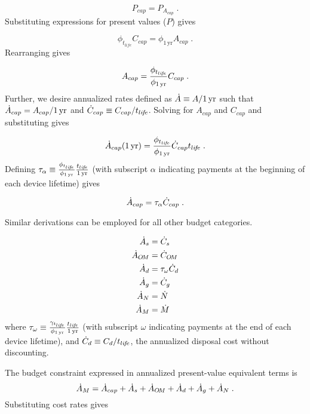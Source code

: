 \begin{equation}
  P_{cap} = P_{A_{cap}} \; .
\end{equation}
%
Substituting expressions for present values ($P$) gives

\begin{equation}
  \phi_{t_{life}} C_{cap} = \phi_{1\,\mathrm{yr}} A_{cap} \; .
\end{equation}
%
Rearranging gives

\begin{equation}
  A_{cap} = \frac{\phi_{t_{li\!f\!e}}}{\phi_{1\,\mathrm{yr}}} C_{cap} \; .
\end{equation}
%
Further, we desire annualized rates defined as
$\dot{A} \equiv A/1\,\mathrm{yr}$ such that
$\dot{A}_{cap} = A_{cap}/1\,\mathrm{yr}$
and 
$\dot{C}_{cap} \equiv C_{cap}/t_{li\!f\!e}$.
Solving for $A_{cap}$ and $C_{cap}$ and substituting gives

\begin{equation}
  \dot{A}_{cap} (1\,\mathrm{yr}) = \frac{\phi_{t_{li\!f\!e}}}{\phi_{1\,\mathrm{yr}}} \dot{C}_{cap} t_{li\!f\!e} \; .
\end{equation}
%
Defining $\tau_\alpha \equiv \frac{\phi_{t_{li\!f\!e}}}{\phi_{1\,\mathrm{yr}}} \frac{t_{li\!f\!e}}{1\,\mathrm{yr}}$ 
(with subscript $\alpha$ indicating payments at the beginning of each 
device lifetime) gives

\begin{equation}
  \dot{A}_{cap} = \tau_\alpha \dot{C}_{cap} \; .
\end{equation}

Similar derivations can be employed for all other budget categories.

\begin{align}
  \dot{A}_s &= \dot{C}_s \\
  \dot{A}_{O\!M} &= \dot{C}_{O\!M} \\
  \dot{A}_d &= \tau_\omega \dot{C}_d \\
  \dot{A}_g &= \dot{C}_g \\
  \dot{A}_N &= \dot{N} \\
  \dot{A}_M &= \dot{M}
\end{align}
%
where 
$\tau_\omega \equiv \frac{\gamma_{t_{li\!f\!e}}}{\phi_{1\,\mathrm{yr}}} \frac{t_{li\!f\!e}}{1\,\mathrm{yr}}$
(with subscript $\omega$ indicating payments 
at the end of each device lifetime), and 
$\dot{C}_d \equiv C_d / t_{li\!f\!e}$, the annualized disposal cost 
without discounting.

The budget constraint expressed in annualized present-value equivalent terms is 
%
\begin{equation}
  \dot{A}_M = \dot{A}_{cap} + 
               \dot{A}_s + 
               \dot{A}_{O\!M} + 
               \dot{A}_d + 
               \dot{A}_g + 
               \dot{A}_N \; .
\end{equation}
%
Substituting cost rates gives

